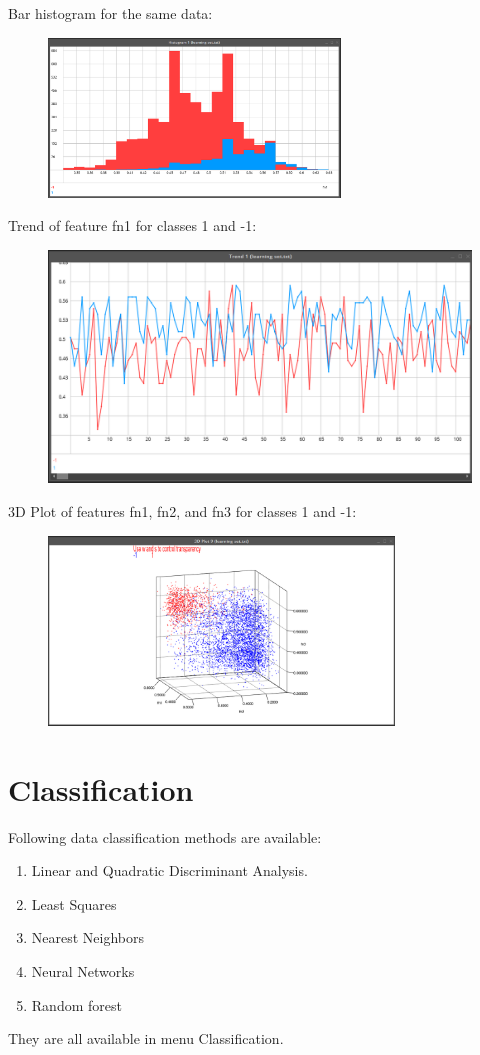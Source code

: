 \documentclass[a4paper,12pt,english]{report}
\begin{document}
Bar histogram for the same data:



\begin{figure}[htb]
\centering
\includegraphics[width=220pt]{fig8.png}
\end{figure} 

\newpage
Trend of feature fn1 for classes 1 and -1:

\begin{figure}[htb]
\centering
\includegraphics[width=320pt]{fig9.png}
\end{figure} 

3D Plot of features fn1, fn2, and fn3 for classes 1 and -1:

\begin{figure}[htb]
\centering
\includegraphics[width=260pt]{fig10.png}
\end{figure}

\newpage

\section*{Classification}
Following data classification methods are available:
\begin{enumerate}
\item	Linear and Quadratic Discriminant Analysis.
\item Least Squares 
\item Nearest Neighbors 
\item Neural Networks 
\item Random forest

\end{enumerate}
They are all available in menu Classification. 
\end{document}
